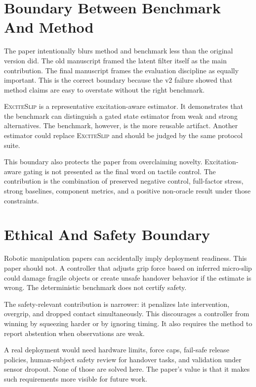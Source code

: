 \documentclass{article}
\newcommand{\method}{\textsc{ExciteSlip}\xspace}
\begin{document}
\section{Boundary Between Benchmark And Method}

The paper intentionally blurs method and benchmark less than the original version did. The old manuscript framed the latent filter itself as the main contribution. The final manuscript frames the evaluation discipline as equally important. This is the correct boundary because the v2 failure showed that method claims are easy to overstate without the right benchmark.

\method is a representative excitation-aware estimator. It demonstrates that the benchmark can distinguish a gated state estimator from weak and strong alternatives. The benchmark, however, is the more reusable artifact. Another estimator could replace \method and should be judged by the same protocol suite.

This boundary also protects the paper from overclaiming novelty. Excitation-aware gating is not presented as the final word on tactile control. The contribution is the combination of preserved negative control, full-factor stress, strong baselines, component metrics, and a positive non-oracle result under those constraints.

\section{Ethical And Safety Boundary}

Robotic manipulation papers can accidentally imply deployment readiness. This paper should not. A controller that adjusts grip force based on inferred micro-slip could damage fragile objects or create unsafe handover behavior if the estimate is wrong. The deterministic benchmark does not certify safety.

The safety-relevant contribution is narrower: it penalizes late intervention, overgrip, and dropped contact simultaneously. This discourages a controller from winning by squeezing harder or by ignoring timing. It also requires the method to report abstention when observations are weak.

A real deployment would need hardware limits, force caps, fail-safe release policies, human-subject safety review for handover tasks, and validation under sensor dropout. None of those are solved here. The paper's value is that it makes such requirements more visible for future work.
\end{document}
